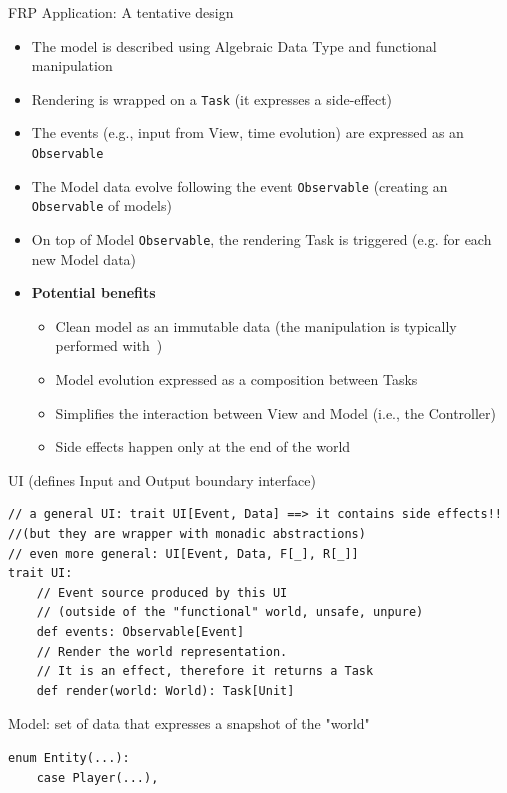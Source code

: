\documentclass[presentation, 9pt]{beamer}\mode<presentation>{\usetheme{AMSBolognaFC}}
\begin{document}
\begin{frame}{FRP Application: A tentative design \href{https://github.com/cric96/scala-frp-gui}{\faLink}}
	\begin{itemize}
		\item The model is described using Algebraic Data Type and functional manipulation
		\item Rendering is wrapped on a \texttt{Task} (it expresses a side-effect)
  	\item The events (e.g., input from View, time evolution) are expressed as an \texttt{Observable}
   	\item The Model data evolve following the event \texttt{Observable} (creating an \texttt{Observable} of models)
    \item On top of Model \texttt{Observable}, the rendering Task is triggered (e.g. for each new Model data)
		\item \textbf{Potential benefits}
		\begin{itemize}
			\item Clean model as an immutable data (the manipulation is typically performed with \href{https://www.optics.dev/Monocle/}{\faLink} \,)
   		\item Model evolution expressed as a composition between Tasks  
			\item Simplifies the interaction between View and Model (i.e., the Controller)
   		\item Side effects happen only at the end of the world
		\end{itemize}
	\end{itemize}
	\begin{alertblock}{UI (defines Input and Output boundary interface)}
	\begin{tcolorbox}[left=0pt, top=0pt, bottom=0pt]
		\begin{verbatim}
// a general UI: trait UI[Event, Data] ==> it contains side effects!! 
//(but they are wrapper with monadic abstractions)
// even more general: UI[Event, Data, F[_], R[_]]
trait UI:
	// Event source produced by this UI 
	// (outside of the "functional" world, unsafe, unpure)
	def events: Observable[Event]
	// Render the world representation. 
	// It is an effect, therefore it returns a Task
	def render(world: World): Task[Unit]
		\end{verbatim}
		\end{tcolorbox}
	\end{alertblock}
	\begin{alertblock}{Model: set of data that expresses a snapshot of the "world"}
		\begin{tcolorbox}[left=0pt, top=0pt, bottom=0pt]
			\begin{verbatim}
enum Entity(...):
	case Player(...),


\end{verbatim}
\end{tcolorbox}
\end{alertblock}
\end{frame}
\end{document}
